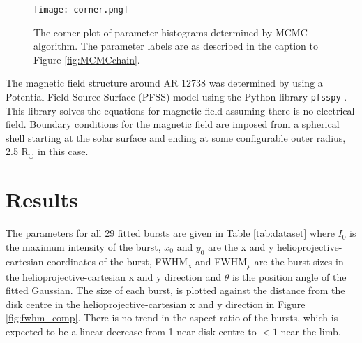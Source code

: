 \begin{figure}[ht]
\centering
\texttt{[image: corner.png]}
\caption[A Corner plot of parameter histograms determined by MCMC algorithm.]{The corner plot of parameter histograms determined by MCMC algorithm. The parameter labels are as described in the caption to Figure \ref{fig:MCMCchain}.}
\label{fig:MCMCcorner}
\end{figure}

The magnetic field structure around AR 12738 was determined by using a Potential Field Source Surface (PFSS) model using the Python library \texttt{pfsspy} \citep{Stansby2020}. This library solves the equations for magnetic field assuming there is no electrical field. Boundary conditions for the magnetic field are imposed from a spherical shell starting at the solar surface and ending at some configurable outer radius, 2.5 R$_\odot$ in this case.


\section{Results}
\label{sec:obsvtheory_results}
The parameters for all 29 fitted bursts are given in Table \ref{tab:dataset} where $I_0$ is the maximum intensity of the burst, $x_0$ and $y_0$ are the x and y  helioprojective-cartesian coordinates of the burst, FWHM\textsubscript{x} and FWHM\textsubscript{y} are the burst sizes in the helioprojective-cartesian x and y direction and $\theta$ is the position angle of the fitted Gaussian. %
The size of each burst, is plotted against the distance from the disk centre in the helioprojective-cartesian x and y direction in Figure \ref{fig:fwhm_comp}. 
There is no trend in the aspect ratio of the bursts, which is expected to be a linear decrease from 1 near disk centre to $< 1$ near the limb. 

